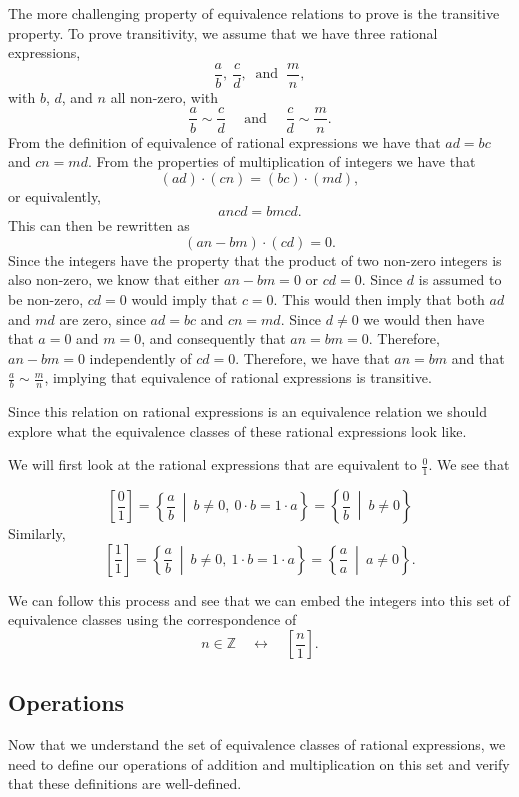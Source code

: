 \documentclass[
]{book}
\theoremstyle{definition}
\theoremstyle{definition}
\theoremstyle{definition}
\theoremstyle{remark}
\begin{document}
The more challenging property of equivalence relations to prove is the transitive property. To prove transitivity, we assume that we have three rational expressions, \[\frac{a}{b}, \: \frac{c}{d}, \: \mbox{ and } \: \frac{m}{n},\] with \(b\), \(d\), and \(n\) all non-zero, with \[\frac{a}{b}\sim \frac{c}{d} \quad \mbox{ and } \quad \frac{c}{d} \sim \frac{m}{n}.\] From the definition of equivalence of rational expressions we have that \(ad=bc\) and \(cn=md\). From the properties of multiplication of integers we have that \[(ad)\cdot (cn) = (bc) \cdot (md),\] or equivalently,
\[ancd = bmcd.\] This can then be rewritten as \[ (an-bm)\cdot (cd) =0.\] Since the integers have the property that the product of two non-zero integers is also non-zero, we know that either \(an-bm=0\) or \(cd=0\). Since \(d\) is assumed to be non-zero, \(cd=0\) would imply that \(c=0\). This would then imply that both \(ad\) and \(md\) are zero, since \(ad=bc\) and \(cn=md\). Since \(d\neq 0\) we would then have that \(a=0\) and \(m=0\), and consequently that \(an=bm=0\). Therefore, \(an-bm=0\) independently of \(cd=0\). Therefore, we have that \(an=bm\) and that \(\frac{a}{b}\sim \frac{m}{n}\), implying that equivalence of rational expressions is transitive.

Since this relation on rational expressions is an equivalence relation we should explore what the equivalence classes of these rational expressions look like.

We will first look at the rational expressions that are equivalent to \(\frac{0}{1}\). We see that

\[\left[\frac{0}{1}\right] = \left\{ \frac{a}{b} \: \middle \vert \: b\neq 0, \: 0\cdot b=1\cdot a\right\} = \left\{\frac{0}{b} \: \middle \vert \: b \neq 0 \right\}\]
Similarly,
\[\left[ \frac{1}{1}\right] = \left\{ \frac{a}{b} \: \middle \vert \: b\neq 0, \: 1\cdot b = 1 \cdot a\right\} = \left\{ \frac{a}{a} \: \middle \vert \: a \neq 0\right\}.\]

We can follow this process and see that we can embed the integers into this set of equivalence classes using the correspondence of
\[ n\in \mathbb{Z} \quad \leftrightarrow \quad \left[\frac{n}{1} \right] .\]

\hypertarget{operations}{%
\subsection{Operations}\label{operations}}

Now that we understand the set of equivalence classes of rational expressions, we need to define our operations of addition and multiplication on this set and verify that these definitions are well-defined.
\end{document}
